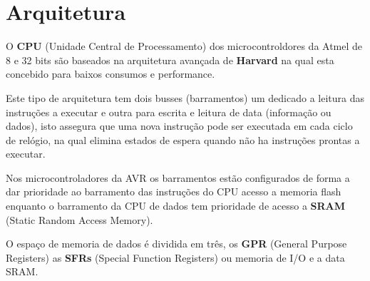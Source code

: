 \documentclass[titlepage, a4paper, 10pt, reqno, openany]{report}
\begin{document}
	\section{Arquitetura}
	O {\bf CPU} (Unidade Central de Processamento) dos microcontroldores da Atmel de 8 e 32 bits s\~{a}o baseados na arquitetura avan\c{c}ada de {\bf Harvard} na qual esta concebido para baixos consumos e performance. \par
	Este tipo de arquitetura tem dois  busses (barramentos) um dedicado a leitura das instruções a executar e outra para escrita e leitura de data (informa\c{c}\~{a}o ou dados), isto assegura que uma nova instru\c{c}\~{a}o pode ser executada em cada ciclo de rel\'{o}gio, na qual elimina estados de espera quando n\~{a}o ha instru\c{c}\~{o}es prontas a executar. \par
	Nos microcontroladores da AVR os barramentos est\~{a}o configurados de forma a dar prioridade ao barramento das instru\c{c}\~{o}es do CPU acesso a memoria flash enquanto o barramento da CPU de dados tem prioridade de acesso a {\bf SRAM} (Static Random Access Memory). \par
	O espa\c{c}o de memoria de dados \'{e} dividida em tr\^{e}s, os {\bf GPR} (General Purpose Registers) as {\bf SFRs} (Special Function Registers) ou memoria de I/O e a data SRAM. \par

\end{document}
